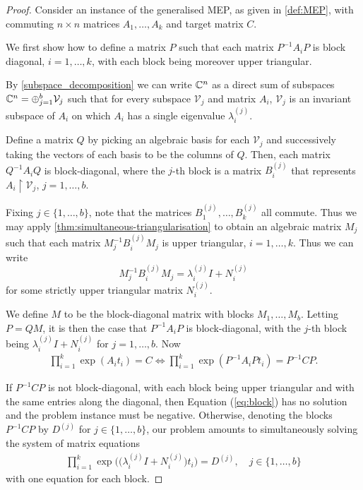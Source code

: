 \begin{proof}
  Consider an instance of the generalised MEP, as given in \cref{def:MEP},
  with commuting $n\times n$ matrices $A_1,\ldots,A_k$ and target
  matrix $C$.

  We first show how to define a matrix $P$ such that each matrix
  $P^{-1}A_iP$ is block diagonal, $i=1,\ldots,k$, with each block
  being moreover upper triangular.

  By \cref{subspace_decomposition} we can write $\mathbb{C}^n$
  as a direct sum of subspaces $\mathbb{C}^n = \oplus_{j=1}^b \mathcal{V}_j$
  such that for every subspace $\mathcal{V}_j$ and matrix $A_i$, $\mathcal{V}_j$ is an
  invariant subspace of $A_i$ on which $A_i$ has a single eigenvalue
  $\lambda_i^{(j)}$.

  Define a matrix $Q$ by picking an algebraic basis for each
  $\mathcal{V}_j$ and successively taking the vectors of each basis to
  be the columns of $Q$. Then, each matrix $Q^{-1} A_{i} Q$ is
  block-diagonal, where the $j$-th block is a matrix $B^{(j)}_i$ that
  represents $A_{i} \restriction{\mathcal{V}_j}$, $j=1,\ldots,b$.

  Fixing $j\in\{1,\ldots,b\}$, note that the
  matrices $B_1^{(j)},\ldots,B_k^{(j)}$ all commute.  Thus we
  may apply \cref{thm:simultaneous-triangularisation} to obtain an
  algebraic matrix $M_j$ such that each matrix $M_j^{-1} B^{(j)}_{i} M_j$
  is upper triangular, $i=1,\ldots,k$.  Thus we can write
  \[ M_j^{-1} B^{(j)}_{i} M_j = \lambda_i^{(j)}I + N_i^{(j)} \]
  for some strictly upper triangular matrix $ N_i^{(j)}$.

  We define $M$ to be the block-diagonal matrix with blocks $M_1,\ldots,M_b$.
  Letting $P=QM$, it is then the case
  that $P^{-1} A_{i} P$ is block-diagonal, with the $j$-th block being
  $\lambda_i^{(j)}I + N_i^{(j)}$ for $j=1,\ldots,b$.  Now
\begin{align}
\prod \limits_{i=1}^{k} \exp(A_{i} t_{i}) = C \Leftrightarrow \prod \limits_{i=1}^{k} \exp(P^{-1}A_{i}P t_{i}) = P^{-1}CP .
\label{eq:block}
\end{align}

If $P^{-1}CP$ is not block-diagonal, with each block being upper
triangular and with the same entries along the diagonal, then Equation
(\ref{eq:block}) has no solution and the problem instance must be
negative. Otherwise, denoting the blocks $P^{-1}CP$ by $D^{(j)}$ for
$j \in \lbrace 1, \ldots, b \rbrace$, our problem amounts to
simultaneously solving the system of matrix equations
\begin{align}
\prod\limits_{i=1}^{k} \exp\big(\big(\lambda_i^{(j)}I + N_i^{(j)}\big)t_{i}\big) = D^{(j)}, \quad j \in \lbrace 1, \ldots, b \rbrace
\label{eq:main1}
\end{align}
with one equation for each block.


\end{proof}
